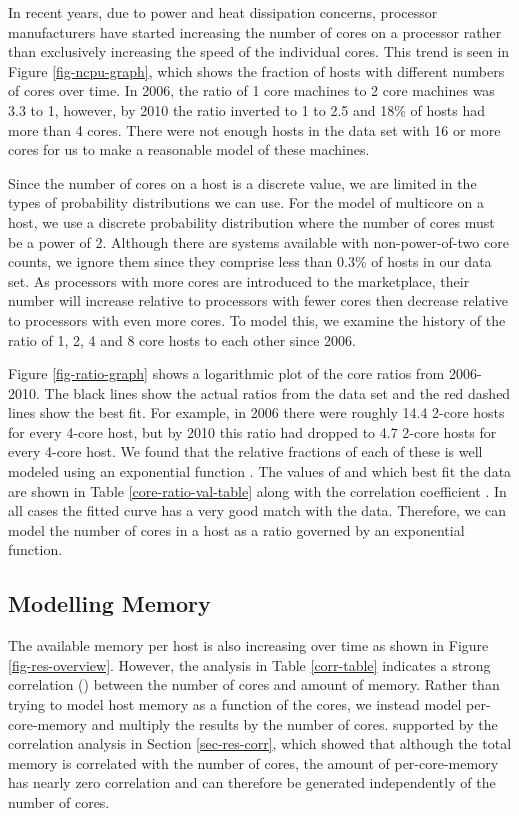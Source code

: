 \documentclass[conference]{IEEEtran}
\begin{document}
In recent years, due to power and heat dissipation concerns, processor manufacturers have started increasing the number of cores on a processor rather than exclusively increasing the speed of the individual cores.  This trend is seen in Figure \ref{fig-ncpu-graph}, which shows the fraction of hosts with different numbers of cores over time.  In 2006, the ratio of 1 core machines to 2 core machines was 3.3 to 1, however, by 2010 the ratio inverted to 1 to 2.5 and 18\% of hosts had more than 4 cores.  There were not enough hosts in the data set with 16 or more cores for us to make a reasonable model of these machines.

Since the number of cores on a host is a discrete value, we are limited in the types of probability distributions we can use.  For the model of multicore on a host, we use a discrete probability distribution where the number of cores must be a power of 2.  Although there are systems available with non-power-of-two core counts, we ignore them since they comprise less than 0.3\% of hosts in our data set.   As processors with more cores are introduced to the marketplace, their number will increase relative to processors with fewer cores then decrease relative to processors with even more cores.  To model this, we examine the history of the ratio of 1, 2, 4 and 8 core hosts to each other since 2006.

Figure \ref{fig-ratio-graph} shows a logarithmic plot of the core ratios from 2006-2010.  The black lines show the actual ratios from the data set and the red dashed lines show the best fit.  For example, in 2006 there were roughly 14.4 2-core hosts for every 4-core host, but by 2010 this ratio had dropped to 4.7 2-core hosts for every 4-core host.  We found that the relative fractions of each of these is well modeled using an exponential function .  The values of  and  which best fit the data are shown in Table \ref{core-ratio-val-table} along with the correlation coefficient .  In all cases the fitted curve has a very good match with the data.  Therefore, we can model the number of cores in a host as a ratio governed by an exponential function.

\subsection{Modelling Memory}
\label{sec-model-mem}
The available memory per host is also increasing over time as shown in Figure \ref{fig-res-overview}.  However, the analysis in Table \ref{corr-table} indicates a strong correlation () between the number of cores and amount of memory.  Rather than trying to model host memory as a function of the cores, we instead model per-core-memory and multiply the results by the number of cores.
 supported by the correlation analysis in Section \ref{sec-res-corr}, which showed that although the total memory is correlated with the number of cores, the amount of per-core-memory has nearly zero correlation and can therefore be generated independently of the number of cores.
\end{document}
